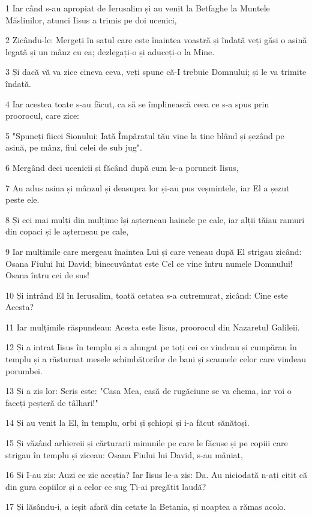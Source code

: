 \par 1 Iar când s-au apropiat de Ierusalim și au venit la Betfaghe la Muntele Măslinilor, atunci Iisus a trimis pe doi ucenici,
\par 2 Zicându-le: Mergeți în satul care este înaintea voastră și îndată veți găsi o asină legată și un mânz cu ea; dezlegați-o și aduceți-o la Mine.
\par 3 Și dacă vă va zice cineva ceva, veți spune că-I trebuie Domnului; și le va trimite îndată.
\par 4 Iar acestea toate s-au făcut, ca să se împlinească ceea ce s-a spus prin proorocul, care zice:
\par 5 "Spuneți fiicei Sionului: Iată Împăratul tău vine la tine blând și șezând pe asină, pe mânz, fiul celei de sub jug".
\par 6 Mergând deci ucenicii și făcând după cum le-a poruncit Iisus,
\par 7 Au adus asina și mânzul și deasupra lor și-au pus veșmintele, iar El a șezut peste ele.
\par 8 Și cei mai mulți din mulțime își așterneau hainele pe cale, iar alții tăiau ramuri din copaci și le așterneau pe cale,
\par 9 Iar mulțimile care mergeau înaintea Lui și care veneau după El strigau zicând: Osana Fiului lui David; binecuvântat este Cel ce vine întru numele Domnului! Osana întru cei de sus!
\par 10 Și intrând El în Ierusalim, toată cetatea s-a cutremurat, zicând: Cine este Acesta?
\par 11 Iar mulțimile răspundeau: Acesta este Iisus, proorocul din Nazaretul Galileii.
\par 12 Și a intrat Iisus în templu și a alungat pe toți cei ce vindeau și cumpărau în templu și a răsturnat mesele schimbătorilor de bani și scaunele celor care vindeau porumbei.
\par 13 Și a zis lor: Scris este: "Casa Mea, casă de rugăciune se va chema, iar voi o faceți peșteră de tâlhari!"
\par 14 Și au venit la El, în templu, orbi și șchiopi și i-a făcut sănătoși.
\par 15 Și văzând arhiereii și cărturarii minunile pe care le făcuse și pe copiii care strigau în templu și ziceau: Osana Fiului lui David, s-au mâniat,
\par 16 Și I-au zis: Auzi ce zic aceștia? Iar Iisus le-a zis: Da. Au niciodată n-ați citit că din gura copiilor și a celor ce sug Ți-ai pregătit laudă?
\par 17 Și lăsându-i, a ieșit afară din cetate la Betania, și noaptea a rămas acolo.
